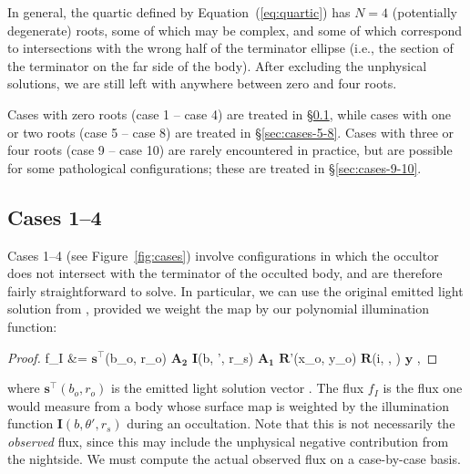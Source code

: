 \documentclass[modern]{aastex62}
\newcommand{\BF}[1]{\ensuremath{\mathbf{#1}}}
\newcommand{\sTe}{\ensuremath{\BF{s}^\top}}
\begin{document}
In general, the quartic defined by Equation~(\ref{eq:quartic}) has
$N=4$ (potentially degenerate) roots, some of which may be complex, and some
of which correspond to intersections with the wrong half of the
terminator ellipse (i.e., the section of the terminator on the far side
of the body). After excluding the unphysical solutions, we are still left with
anywhere between zero and four roots.

Cases with zero roots (case 1 -- case 4) are treated in \S\ref{sec:cases-1-4},
while cases with one or two roots (case 5 -- case 8) are treated in
\S\ref{sec:cases-5-8}. Cases with three or four roots
(case 9 -- case 10) are rarely encountered
in practice, but are possible for some pathological configurations; these are
treated in \S\ref{sec:cases-9-10}.

%

\subsection{Cases 1--4}
\label{sec:cases-1-4}
%
Cases 1--4 (see Figure~\ref{fig:cases}) involve configurations in which the
occultor does not intersect with
the terminator of the occulted body, and are therefore fairly
straightforward to solve. In particular, we can use the original emitted
light solution from \citet{Luger2019}, provided we weight the map by our
polynomial illumination function:
%
\begin{proof}{}
    \label{eq:fI}
    f_I &=
    \sTe(b_o, r_o)
    \BF{A_2}
    \BF{I}(b, \theta', r_s)
    \BF{A_1}
    \BF{R}'(x_o, y_o)
    \BF{R}(i, \lambda, \vartheta)
    \BF{y}
    \quad,
\end{proof}
%
where $\sTe(b_o, r_o)$ is the emitted light solution vector
\citep[Equation~26 in][]{Luger2019}. The flux $f_I$ is the flux one would
measure from a body whose surface map is weighted by the illumination function
$\BF{I}(b, \theta', r_s)$ during an occultation. Note that this is not
necessarily the \emph{observed} flux, since this may include the unphysical
negative contribution from the nightside. We must compute the actual
observed flux on a case-by-case basis.
\end{document}
